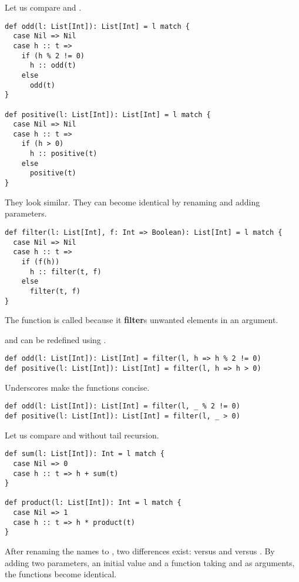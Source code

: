 Let us compare  and .

\begin{verbatim}
def odd(l: List[Int]): List[Int] = l match {
  case Nil => Nil
  case h :: t =>
    if (h % 2 != 0)
      h :: odd(t)
    else
      odd(t)
}

def positive(l: List[Int]): List[Int] = l match {
  case Nil => Nil
  case h :: t =>
    if (h > 0)
      h :: positive(t)
    else
      positive(t)
}
\end{verbatim}

They look similar. They can become identical by renaming and adding parameters.

\begin{verbatim}
def filter(l: List[Int], f: Int => Boolean): List[Int] = l match {
  case Nil => Nil
  case h :: t =>
    if (f(h))
      h :: filter(t, f)
    else
      filter(t, f)
}
\end{verbatim}


The function is called  because it \textbf{filter}s
unwanted elements in an argument.

 and  can be redefined using .

\begin{verbatim}
def odd(l: List[Int]): List[Int] = filter(l, h => h % 2 != 0)
def positive(l: List[Int]): List[Int] = filter(l, h => h > 0)
\end{verbatim}

Underscores make the functions concise.

\begin{verbatim}
def odd(l: List[Int]): List[Int] = filter(l, _ % 2 != 0)
def positive(l: List[Int]): List[Int] = filter(l, _ > 0)
\end{verbatim}

Let us compare  and  without tail recursion.

\begin{verbatim}
def sum(l: List[Int]): Int = l match {
  case Nil => 0
  case h :: t => h + sum(t)
}

def product(l: List[Int]): Int = l match {
  case Nil => 1
  case h :: t => h * product(t)
}
\end{verbatim}

After renaming the names to , two differences exist:  versus
 and  versus . By adding two parameters, an
initial value and a function taking  and  as arguments, the
functions become identical.

